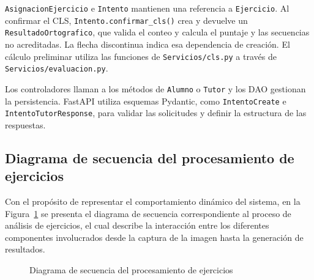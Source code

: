\texttt{AsignacionEjercicio} e \texttt{Intento} mantienen una referencia a \texttt{Ejercicio}. Al confirmar el CLS, \texttt{Intento.confirmar\_cls()} crea y devuelve un \texttt{ResultadoOrtografico}, que valida el conteo y calcula el puntaje y las secuencias no acreditadas. La flecha discontinua indica esa dependencia de creación. El cálculo preliminar utiliza las funciones de \texttt{Servicios/cls.py} a través de \texttt{Servicios/evaluacion.py}.

Los controladores llaman a los métodos de \texttt{Alumno} o \texttt{Tutor} y los DAO gestionan la persistencia. FastAPI utiliza esquemas Pydantic, como \texttt{IntentoCreate} e \texttt{IntentoTutorResponse}, para validar las solicitudes y definir la estructura de las respuestas.


\subsection{Diagrama de secuencia del procesamiento de ejercicios}

Con el propósito de representar el comportamiento dinámico del sistema, en la Figura~\ref{fig:diagrama_secuencia} se presenta el diagrama de secuencia correspondiente al proceso de análisis de ejercicios, el cual describe la interacción entre los diferentes componentes involucrados desde la captura de la imagen hasta la generación de resultados.

\begin{figure}[H]
    \centering
    \caption{Diagrama de secuencia del procesamiento de ejercicios}
    \label{fig:diagrama_secuencia}
\end{figure}

